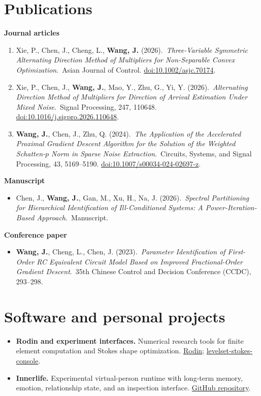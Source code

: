 \documentclass[10pt,a4paper]{article}
\newcommand{\paper}[3]{\item #1.\ \textit{#2}.\ #3}
\begin{document}
\section{Publications}
\textbf{Journal articles}
\begin{enumerate}[leftmargin=16pt,itemsep=10pt]
\paper{Xie, P., Chen, J., Cheng, L., \textbf{Wang, J.} (2026)}{Three-Variable Symmetric Alternating Direction Method of Multipliers for Non-Separable Convex Optimization}{Asian Journal of Control. \href{https://doi.org/10.1002/asjc.70174}{doi:10.1002/asjc.70174}.}
\paper{Xie, P., Chen, J., \textbf{Wang, J.}, Mao, Y., Zhu, G., Yi, Y. (2026)}{Alternating Direction Method of Multipliers for Direction of Arrival Estimation Under Mixed Noise}{Signal Processing, 247, 110648. \href{https://doi.org/10.1016/j.sigpro.2026.110648}{doi:10.1016/j.sigpro.2026.110648}.}
\paper{\textbf{Wang, J.}, Chen, J., Zhu, Q. (2024)}{The Application of the Accelerated Proximal Gradient Descent Algorithm for the Solution of the Weighted Schatten-$p$ Norm in Sparse Noise Extraction}{Circuits, Systems, and Signal Processing, 43, 5169--5190. \href{https://doi.org/10.1007/s00034-024-02697-z}{doi:10.1007/s00034-024-02697-z}.}
\end{enumerate}
\vspace{5pt}\textbf{Manuscript}
\begin{itemize}[itemsep=8pt]
\paper{Chen, J., \textbf{Wang, J.}, Gan, M., Xu, H., Na, J. (2026)}{Spectral Partitioning for Hierarchical Identification of Ill-Conditioned Systems: A Power-Iteration-Based Approach}{Manuscript.}
\end{itemize}
\vspace{5pt}\textbf{Conference paper}
\begin{itemize}[itemsep=8pt]
\paper{\textbf{Wang, J.}, Cheng, L., Chen, J. (2023)}{Parameter Identification of First-Order RC Equivalent Circuit Model Based on Improved Fractional-Order Gradient Descent}{35th Chinese Control and Decision Conference (CCDC), 293--298.}
\end{itemize}

\section{Software and personal projects}
\begin{itemize}[itemsep=6pt]
\item \textbf{Rodin and experiment interfaces.} Numerical research tools for finite element computation and Stokes shape optimization. \href{https://github.com/kazusa000/rodin}{Rodin}; \href{https://github.com/kazusa000/levelset-stokes-console}{levelset-stokes-console}.
\item \textbf{Innerlife.} Experimental virtual-person runtime with long-term memory, emotion, relationship state, and an inspection interface. \href{https://github.com/kazusa000/Innerlife}{GitHub repository}.
\end{itemize}
\end{document}
